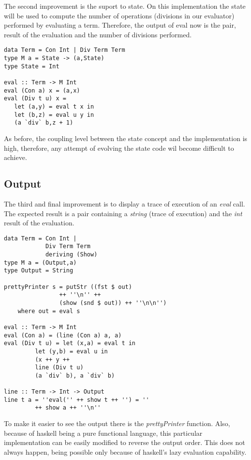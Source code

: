 \documentclass[twocolumn,10pt]{article}
\begin{document}
The second improvement is the suport to state. On this implementation the state will be used to compute the number of operations (divisions in our evaluator) performed by evaluating a term. Therefore, the output of eval now is the pair, result of the evaluation and the number of divisions performed.

\lstset{language=Haskell}
\begin{lstlisting}
data Term = Con Int | Div Term Term
type M a = State -> (a,State)
type State = Int

eval :: Term -> M Int
eval (Con a) x = (a,x)
eval (Div t u) x =
   let (a,y) = eval t x in
   let (b,z) = eval u y in
   (a `div` b,z + 1)
\end{lstlisting}

As before, the coupling level between the state concept and the implementation is high, therefore, any attempt of evolving the state code wil become difficult to achieve.

\subsection{Output}

The third and final improvement is to display a trace of execution of an \textit{eval} call. The expected result is a pair containing a \textit{string} (trace of execution) and the \textit{int} result of the evaluation.

\lstset{language=Haskell}
\begin{lstlisting}
data Term = Con Int | 
            Div Term Term 
            deriving (Show)
type M a = (Output,a)
type Output = String

prettyPrinter s = putStr ((fst $ out) 
                ++ ''\n'' ++ 
                (show (snd $ out)) ++ ''\n\n'')
	where out = eval s

eval :: Term -> M Int
eval (Con a) = (line (Con a) a, a)
eval (Div t u) = let (x,a) = eval t in
		 let (y,b) = eval u in
		 (x ++ y ++ 
		 line (Div t u) 
		 (a `div` b), a `div` b)

line :: Term -> Int -> Output
line t a = ''eval('' ++ show t ++ '') = ''
		 ++ show a ++ ''\n''
\end{lstlisting}

To make it easier to see the output there is the \textit{prettyPrinter} function. Also, because of haskell being a pure functional language, this particular implementation can be easily modified to reverse the output order. This does not always happen, being possible only because of haskell's lazy evaluation capability. 
\end{document}
